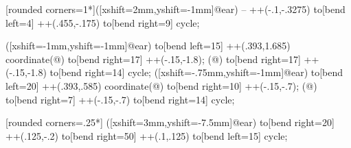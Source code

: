 { [rounded corners=1*\pingu@@horse@scale]([xshift=2mm,yshift=-1mm]@ear) -- ++(-.1,-.3275) to[bend left=4] ++(.455,-.175) to[bend right=9] cycle;
\fi

\if@pingu@@horse@@donkey@
{} ([xshift=-1mm,yshift=-1mm]@ear) to[bend left=15] ++(.393,1.685) coordinate(@) to[bend right=17] ++(-.15,-1.8);
 (@) to[bend right=17] ++(-.15,-1.8) to[bend right=14] cycle;
\else
{} ([xshift=-.75mm,yshift=-1mm]@ear) to[bend left=20] ++(.393,.585) coordinate(@) to[bend right=10] ++(-.15,-.7);
 (@) to[bend right=7] ++(-.15,-.7) to[bend right=14] cycle;
\fi

 [rounded corners=.25*\pingu@@horse@scale] ([xshift=3mm,yshift=-7.5mm]@ear) to[bend right=20] ++(.125,-.2) to[bend right=50] ++(.1,.125) to[bend left=15] cycle;
}

\newif\if@pingu@@horse@@donkey@


